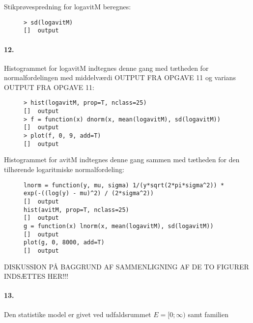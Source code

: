 Stikprøvespredning for logavitM beregnes:

\begin{figure}[H]
\label{fig:anal8}
\begin{center}
\begin{verbatim}
> sd(logavitM)
[]  output
\end{verbatim}
\caption{}
\end{center}
\end{figure}

\paragraph{12.}
Histogrammet for logavitM indtegnes denne gang med tætheden for 
normalfordelingen med middelværdi OUTPUT FRA OPGAVE 11 og varians
OUTPUT FRA OPGAVE 11:

\begin{figure}[H]
\label{fig:anal9}
\begin{center}
\begin{verbatim}
> hist(logavitM, prop=T, nclass=25)
[]  output
> f = function(x) dnorm(x, mean(logavitM), sd(logavitM))
[]  output
> plot(f, 0, 9, add=T)
[]  output
\end{verbatim}
\caption{}
\end{center}
\end{figure}

Histogrammet for avitM indtegnes denne gang sammen med tætheden for 
den tilhørende logaritmiske normalfordeling:

\begin{figure}[H]
\label{fig:anal10}
\begin{center}
\begin{verbatim}
lnorm = function(y, mu, sigma) 1/(y*sqrt(2*pi*sigma^2)) * 
exp(-((log(y) - mu)^2) / (2*sigma^2))
[]  output
hist(avitM, prop=T, nclass=25)
[]  output
g = function(x) lnorm(x, mean(logavitM), sd(logavitM))
[]  output
plot(g, 0, 8000, add=T)
[]  output
\end{verbatim}
\caption{}
\end{center}
\end{figure}

DISKUSSION PÅ BAGGRUND AF SAMMENLIGNING AF DE TO FIGURER INDSÆTTES 
HER!!!

\paragraph{13.}
Den statistike model er givet ved udfaldsrummet $E=[0; \infty)$ samt
familien

